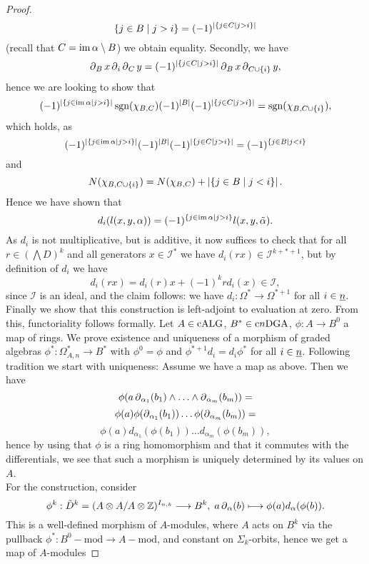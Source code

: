 \begin{prop}
\begin{proof}
\[{{    \{ j \in B \mid j > i \} } } = (-1)^{ \left\vert \{j \in C \mid j > i\} \right\vert }\]%
(recall that $C = \operatorname{im} \alpha \setminus B$) we obtain equality. Secondly, we have%
    \[\del_B x \del_i \del_C y = (-1)^{ \abs{ \{j \in C \with j > i\} } }%
    \del_B x \del_{ C \cup \{i\} } y, \]
hence we are looking to show that%
    \[ (-1)^{\abs{\{ j \in \im \alpha \with j > i \}} } \sgn(\chi_{B,C})%
    (-1)^{\abs{B}} (-1)^{ \abs{ \{j \in C \with j > i\} } } = %
    \sgn( \chi_{ B, C \cup \{i\} } ), \]
which holds, as%
    \[ (-1)^{\abs{\{ j \in \im \alpha \with j > i \}} } %
    (-1)^{\abs{B}} (-1)^{ \abs{ \{j \in C \with j > i\} } } =%
    (-1)^{ \{ j \in B \with j < i \} } \]%
and%
    \[ N(\chi_{ B, C \cup \{i\} }) = N(\chi_{B,C}) + %
    \abs{ \{j \in B \with j < i\} }. \]
Hence we have shown that%
    \[ d_i ( l(x,y,\alpha) ) = (-1)^{ \{j \in \im \alpha \with j > i \} }%
    l(x,y,\tilde \alpha). \]
As $d_i$ is not multiplicative, but is additive, it now suffices to check that for all $r \in (\bigwedge D)^k$ and all generators $x \in \mathcal{I}^*$ we have $d_i(rx) \in \mathcal{I}^{k+*+1}$, but by definition of $d_i$ we have%
    \[ d_i(rx) = d_i(r) x + (-1)^k r d_i(x) \in \mathcal{I}, \]
since $\mathcal{I}$ is an ideal, and the claim follows: we have $d_i:\Omega^* \to \Omega^{*+1}$ for all $i \in \underline{n}$.\\
Finally we show that this construction is left-adjoint to evaluation at zero. From this, functoriality follows formally. Let $A \in \mathrm{cALG}$, $B^* \in \mathrm{c}n\mathrm{DGA}$, $\phi: A \to B^0$ a map of rings. We prove existence and uniqueness of a morphism of graded algebras $\phi^*: \Omega^*_{A,n} \to B^*$ with $\phi^0 = \phi$ and $\phi^{*+1} d_i = d_i \phi^*$ for all $i \in \underline{n}$. Following tradition we start with uniqueness: Assume we have a map as above. Then we have
    \[ \phi(a \operatorname{\partial}_{\alpha_1} (b_1) \wedge \ldots \wedge \operatorname{\partial}_{\alpha_m} (b_m)) = \]
    \[ \phi(a) \phi (\operatorname{\partial}_{\alpha_1} (b_1)) \ldots \phi(\operatorname{\partial}_{\alpha_m} (b_m)) = \]
    \[ \phi(a) d_{\alpha_1} (\phi(b_1)) \ldots d_{\alpha_m} (\phi(b_m)), \]
hence by using that $\phi$ is a ring homomorphism and that it commutes with the differentials, we see that such a morphism is uniquely determined by its values on $A$.\\ For the construction, consider%
    \[ \phi^k: \tilde D^k = (A \otimes A / A \otimes \bZ)^{I_{n,k}} %
    \to B^k, \; a \del_\alpha (b) \mapsto %
    \phi(a) d_\alpha (\phi(b)). \]
This is a well-defined morphism of $A$-modules, where $A$ acts on $B^k$ via the pullback $\phi^*:B^0-\mathrm{mod} \to A-\mathrm{mod}$, and constant on $\Sigma_k$-orbits, hence we get a map of $A$-modules%

\end{proof}
\end{prop}
